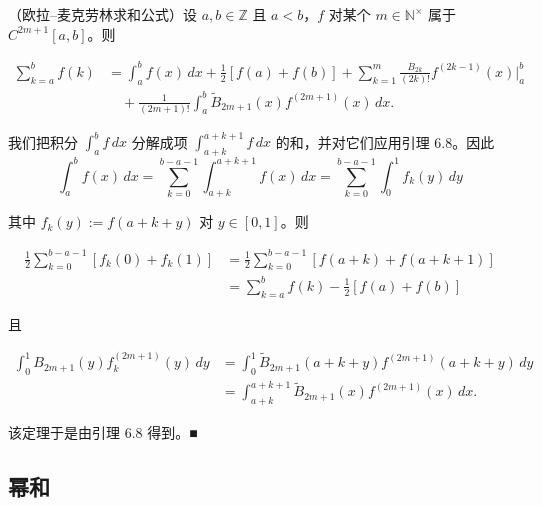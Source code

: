 \begin{theorem}

（欧拉–麦克劳林求和公式）设 $ a, b \in \mathbb{Z} $ 且 $ a < b $，$ f $ 对某个 $ m \in \mathbb{N}^\times $ 属于 $ C^{2m+1}[a, b] $。则

\begin{equation*}
\begin{aligned}
\sum_{k=a}^{b} f(k) &= \int_a^b f(x)\,dx + \frac{1}{2}[f(a) + f(b)] + \sum_{k=1}^{m}\frac{B_{2k}}{(2k)!}f^{(2k-1)}(x)\Big|_a^b \\ &\quad + \frac{1}{(2m+1)!}\int_a^b \widetilde{B}_{2m+1}(x)f^{(2m+1)}(x)\,dx .
\end{aligned}
\end{equation*}

\proofhead
我们把积分 $ \int_a^b f \,dx $ 分解成项 $ \int_{a+k}^{a+k+1} f \,dx $ 的和，并对它们应用引理 6.8。因此
\[
\int_a^b f(x)\,dx = \sum_{k=0}^{b-a-1}\int_{a+k}^{a+k+1} f(x)\,dx = \sum_{k=0}^{b-a-1}\int_0^1 f_k(y)\,dy
\]

其中 $ f_k(y) := f(a + k + y) $ 对 $ y \in [0, 1] $。则

\begin{equation*}
\begin{aligned}
\frac{1}{2}\sum_{k=0}^{b-a-1}[f_k(0) + f_k(1)] &= \frac{1}{2}\sum_{k=0}^{b-a-1}[f(a + k) + f(a + k + 1)] \\ &= \sum_{k=a}^{b} f(k) - \frac{1}{2}[f(a) + f(b)]
\end{aligned}
\end{equation*}

且

\begin{equation*}
\begin{aligned}
\int_0^1 B_{2m+1}(y)f_k^{(2m+1)}(y)\,dy &= \int_0^1 \widetilde{B}_{2m+1}(a + k + y)f^{(2m+1)}(a + k + y)\,dy \\ &= \int_{a+k}^{a+k+1}\widetilde{B}_{2m+1}(x)f^{(2m+1)}(x)\,dx .
\end{aligned}
\end{equation*}

该定理于是由引理 6.8 得到。\nobreak\hspace{0.35em}■

\end{theorem}

\subsection*{幂和}

